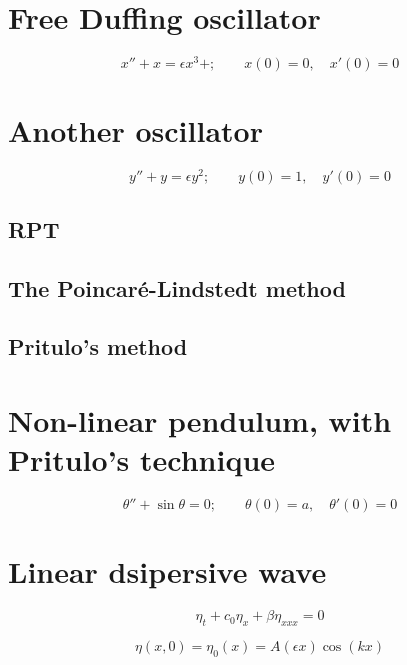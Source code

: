 \documentclass[11pt,letter, swedish, english
]{article}
\begin{document}
\section{Free Duffing oscillator}

\begin{equation}
x''+x=\epsilon {x}^3+;\qquad
x(0)=0,\quad {x'}(0)=0
\end{equation}

\section{Another oscillator}

\begin{equation}
y''+y=\epsilon y^2;\qquad
y(0)=1,\quad y'(0)=0
\end{equation}

\subsection{RPT}

\subsection{The Poincaré-Lindstedt method}

\subsection{Pritulo's method}



\section{Non-linear pendulum, with Pritulo's technique}

\begin{equation}
\theta''+\sin\theta =0;\qquad
\theta(0)=a,\quad \theta'(0)=0
\end{equation}


\section{Linear dsipersive wave}


\begin{equation}
\eta_t + c_0\eta_{x}+\beta\eta_{xxx}=0
\end{equation}

\begin{equation}
\eta(x, 0)=\eta_0(x)=A(\epsilon x)\cos(kx)
\end{equation}
\end{document}
